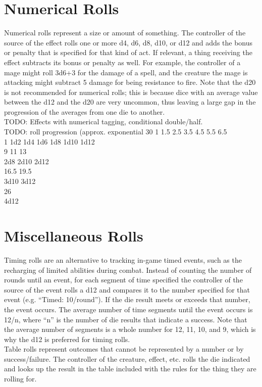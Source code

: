\documentclass[letterpaper,titlepage,openany,twocolumn]{book}
\begin{document}
\section{Numerical Rolls}
Numerical rolls represent a size or amount of something. The controller of the source of the effect rolls one or more d4, d6, d8, d10, or d12 and adds the bonus or penalty that is specified for that kind of act. If relevant, a thing receiving the effect subtracts its bonus or penalty as well. For example, the controller of a mage might roll 3d6+3 for the damage of a spell, and the creature the mage is attacking might subtract 5 damage for being resistance to fire. Note that the d20 is not recommended for numerical rolls; this is because dice with an average value between the d12 and the d20 are very uncommon, thus leaving a large gap in the progression of the averages from one die to another.\\
TODO: Effects with numerical tagging, conditional double/half.\\
TODO: roll progression (approx. exponential 30%
1	1.5	2.5	3.5	4.5	5.5	6.5\\
1	1d2	1d4	1d6	1d8	1d10	1d12\\
				9	11	13\\
				2d8	2d10	2d12\\
					16.5	19.5\\
					3d10	3d12\\
						26\\
						4d12\\

\section{Miscellaneous Rolls}
Timing rolls are an alternative to tracking in-game timed events, such as the recharging of limited abilities during combat. Instead of counting the number of rounds until an event, for each segment of time specified the controller of the source of the event rolls a d12 and compares it to the number specified for that event (e.g. “Timed: 10/round”). If the die result meets or exceeds that number, the event occurs. The average number of time segments until the event occurs is 12/n, where “n” is the number of die results that indicate a success. Note that the average number of segments is a whole number for 12, 11, 10, and 9, which is why the d12 is preferred for timing rolls.\\

Table rolls represent outcomes that cannot be represented by a number or by success/failure. The controller of the creature, effect, etc. rolls the die indicated and looks up the result in the table included with the rules for the thing they are rolling for.\\
\end{document}
